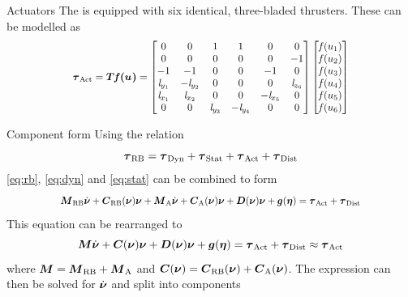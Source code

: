 \documentclass[11pt,aspectratio=169]{beamer}
\newcommand\scalemath[2]{\scalebox{#1}{\mbox{\ensuremath{\displaystyle #2}}}}
\begin{document}
\begin{frame}{Actuators}
The \abbrROV is equipped with six identical, three-bladed thrusters. These can be modelled as
\begin{align}\label{eq:act}
    \scalemath{0.9}{\tauVector_{\text{Act}} =  \thrusterGeometry \boldsymbol{\thrusterfun{}} 
    =
    \begin{bmatrix}
    0& 0& 1& 1& 0& 0\\
    0& 0& 0&  0& 0& -1\\
    -1& -1& 0& 0& -1& 0\\
    \distance{y}{1} & -\distance{y}{2} & 0 &  0 &  0 & \distance{z}{6} \\
    \distance{x}{1} & \distance{x}{2} & 0 & 0 & -\distance{x}{5} & 0 \\
    0 & 0 & \distance{y}{3} & -\distance{y}{4} & 0 & 0 \\
    \end{bmatrix}
    \begin{bmatrix}
    \thrusterfun{1} \\
    \thrusterfun{2} \\
    \thrusterfun{3} \\
    \thrusterfun{4} \\
    \thrusterfun{5} \\
    \thrusterfun{6} \\
    \end{bmatrix}}
\end{align}
\end{frame}

\begin{frame}{Component form}
Using the relation
\begin{equation}
\boldsymbol{\tau}_{\text{RB}} = \boldsymbol{\tau}_{\text{Dyn}} + \boldsymbol{\tau}_{\text{Stat}} + \boldsymbol{\tau}_{\text{Act}} + \boldsymbol{\tau}_{\text{Dist}}
\end{equation} \eqref{eq:rb}, \eqref{eq:dyn} and \eqref{eq:stat} can be combined to form
\begin{equation}
\scalemath{0.85}{\inertia_{\text{RB}}\dot{\nuVector} + \coriolis_{\text{RB}}(\nuVector)\nuVector + \inertia_{\text{A}} \dot{\nuVector} +\coriolis_{\text{A}}(\nuVector)\nuVector + \damping(\nuVector)\nuVector + \gravity(\etaVector) = \tauVector_\text{{Act}} + \tauVector_{\text{Dist}}}
\end{equation}
This equation can be rearranged to
\begin{equation}
\boldsymbol{M} \dot{\boldsymbol{\nu}} + \boldsymbol{C}(\boldsymbol{\nu})\boldsymbol{\nu} + \boldsymbol{D}(\boldsymbol{\nu})\boldsymbol{\nu} + \boldsymbol{g}(\boldsymbol{\eta}) = \boldsymbol{\tau}_{\text{Act}} + \boldsymbol{\tau}_{\text{Dist}} \approx \boldsymbol{\tau}_{\text{Act}}
\end{equation}
where $\boldsymbol{M} = \boldsymbol{M}_{\text{RB}} + \boldsymbol{M}_{\text{A}}$ and $\boldsymbol{C}(\boldsymbol{\nu})=\boldsymbol{C}_{\text{RB}}(\boldsymbol{\nu})+\boldsymbol{C}_{\text{A}}(\boldsymbol{\nu})$.
The expression can then be solved for $\dot{\boldsymbol{\nu}}$ and split into components 

\end{frame}
\end{document}
